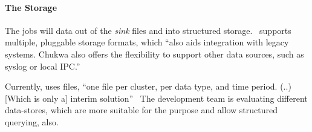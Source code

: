 
\paragraph{The Storage}

The \mr jobs will \demux data out of the \textit{sink} files and into structured storage.~\cite{Boulonb} 
\chuk supports multiple, pluggable storage formats, which ``also aids integration with legacy systems. Chukwa also offers the flexibility to support other data sources, such as syslog or local IPC.''~\cite{Rabkin2010a} 

Currently, \chuk uses \hdfs files, ``one file per cluster, per data type, and time period. (..) [Which is only a] interim solution''~\cite{Boulona} 
The development team is evaluating different data-stores, which are more suitable for the purpose and allow structured querying, also.
